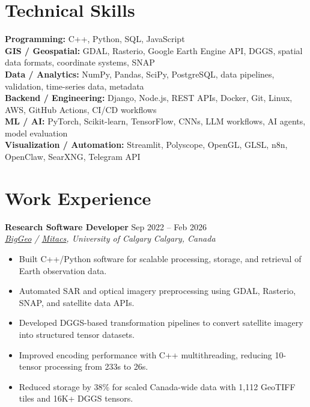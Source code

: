\documentclass[a4paper,10pt]{article}
\newcommand{\resumeSubheading}[4]{
    \textbf{#1} \hfill #2 \\
    \textit{#3} \hfill \textit{#4}
}
\begin{document}
\section*{Technical Skills}

\textbf{Programming:} C++, Python, SQL, JavaScript \\
\textbf{GIS / Geospatial:} GDAL, Rasterio, Google Earth Engine API, DGGS, spatial data formats, coordinate systems, SNAP \\
\textbf{Data / Analytics:} NumPy, Pandas, SciPy, PostgreSQL, data pipelines, validation, time-series data, metadata \\
\textbf{Backend / Engineering:} Django, Node.js, REST APIs, Docker, Git, Linux, AWS, GitHub Actions, CI/CD workflows \\
\textbf{ML / AI:} PyTorch, Scikit-learn, TensorFlow, CNNs, LLM workflows, AI agents, model evaluation \\
\textbf{Visualization / Automation:} Streamlit, Polyscope, OpenGL, GLSL, n8n, OpenClaw, SearXNG, Telegram API


\section*{Work Experience}

\resumeSubheading
{Research Software Developer}
{Sep 2022 -- Feb 2026}
{\href{https://biggeo.com}{BigGeo} / \href{https://www.mitacs.ca/}{Mitacs}, University of Calgary}
{Calgary, Canada}
\begin{itemize}[leftmargin=0.25in]
    \item Built C++/Python software for scalable processing, storage, and retrieval of Earth observation data.
    \item Automated SAR and optical imagery preprocessing using GDAL, Rasterio, SNAP, and satellite data APIs.
    \item Developed DGGS-based transformation pipelines to convert satellite imagery into structured tensor datasets.
    \item Improved encoding performance with C++ multithreading, reducing 10-tensor processing from 233s to 26s.
    \item Reduced storage by 38\% for scaled Canada-wide data with 1,112 GeoTIFF tiles and 16K+ DGGS tensors.
\end{itemize}
\end{document}
